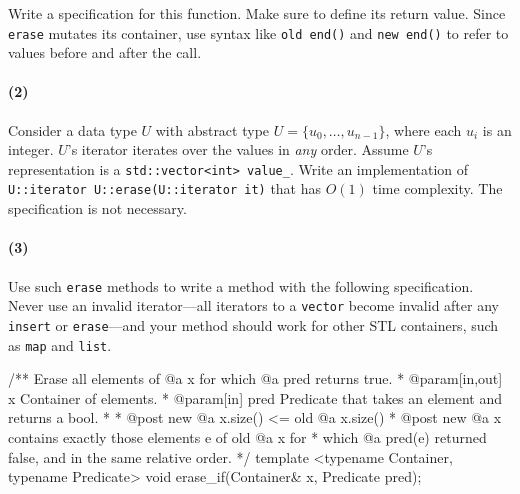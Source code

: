 \documentclass[12pt,letterpaper,twoside]{article}
\begin{document}
Write a specification for this function. Make sure to define its return value. Since {\tt erase} mutates its container, use syntax like {\tt old end()} and {\tt new end()} to refer to values before and after the call.

\paragraph{(2)} Consider a data type $U$ with abstract type $U = \{u_0,\dots,u_{n-1}\}$, where each $u_i$ is an integer. $U$'s iterator iterates over the values in \emph{any} order. Assume $U$'s representation is a \texttt{std::vector<int> value\_}. Write an implementation of \texttt{U::iterator U::erase(U::iterator it)} that has $O(1)$ time complexity. The specification is not necessary.

\paragraph{(3)} Use such \texttt{erase} methods to write a method with the
following specification. Never use an invalid iterator---all iterators to a
\texttt{vector} become invalid after any \texttt{insert} or
\texttt{erase}---and your method should work for other STL containers, such
as \texttt{map} and \texttt{list}.

\begin{cpp}
/** Erase all elements of @a x for which @a pred returns true.
 * @param[in,out] x Container of elements.
 * @param[in] pred Predicate that takes an element and returns a bool.
 *
 * @post new @a x.size() <= old @a x.size()
 * @post new @a x contains exactly those elements e of old @a x for 
 *     which @a pred(e) returned false, and in the same relative order.
 */
template <typename Container, typename Predicate>
void erase_if(Container& x, Predicate pred);
\end{cpp}
\end{document}

